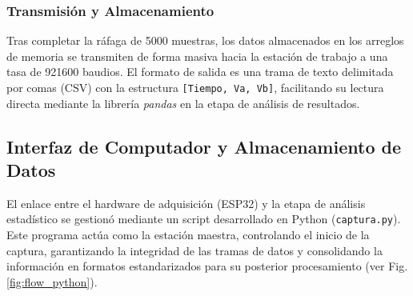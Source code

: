 \documentclass[conference]{IEEEtran}
\begin{document}
\subsubsection{Transmisión y Almacenamiento}
Tras completar la ráfaga de \num{5000} muestras, los datos almacenados en los arreglos de memoria se transmiten de forma masiva hacia la estación de trabajo a una tasa de \num{921600} baudios. El formato de salida es una trama de texto delimitada por comas (CSV) con la estructura \texttt{[Tiempo, Va, Vb]}, facilitando su lectura directa mediante la librería \textit{pandas} en la etapa de análisis de resultados.

\subsection{Interfaz de Computador y Almacenamiento de Datos}
\label{subsec:interfaz_python}

El enlace entre el hardware de adquisición (ESP32) y la etapa de análisis estadístico se gestionó mediante un script desarrollado en Python (\texttt{captura.py}). Este programa actúa como la estación maestra, controlando el inicio de la captura, garantizando la integridad de las tramas de datos y consolidando la información en formatos estandarizados para su posterior procesamiento (ver Fig. \ref{fig:flow_python}).
\end{document}
